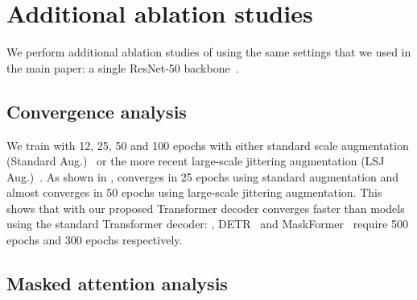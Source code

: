 \section{Additional ablation studies}
\label{app:abl}
We perform additional ablation studies of \modelname using the same settings that we used in the main paper: a single ResNet-50 backbone~\cite{he2016deep}.

\subsection{Convergence analysis}
We train \modelname  with 12, 25, 50 and 100 epochs with either standard scale augmentation (Standard Aug.)~\cite{wu2019detectron2} or the more recent large-scale jittering augmentation (LSJ Aug.)~\cite{ghiasi2021simple,du2021simple}. As shown in , \modelname converges in 25 epochs using standard augmentation and almost converges in 50 epochs using large-scale jittering augmentation. This shows that \modelname with our proposed Transformer decoder converges faster than models using the standard Transformer decoder: \eg, DETR~\cite{detr} and MaskFormer~\cite{cheng2021maskformer} require 500 epochs and 300 epochs respectively.

\subsection{Masked attention analysis}

